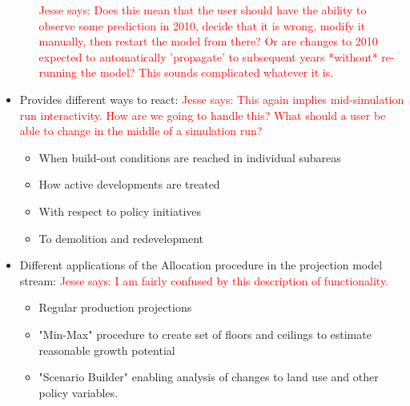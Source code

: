 \documentclass[titlepage]{article}
\begin{document}
\begin{itemize}
\begin{itemize}
				\textcolor{red}{Jesse says: Does this mean that the user should have the ability to observe some prediction in 2010, decide that it is wrong, modify it manually, then restart the model from there?  Or are changes to 2010 expected to automatically 'propagate' to subsequent years *without* re-running the model?  This sounds complicated whatever it is.}
		\end{itemize}
	\item Provides different ways to react:
		\textcolor{red}{Jesse says: This again implies mid-simulation run interactivity.  How are we going to handle this? What should a user be able to change in the middle of a simulation run?}
		\begin{itemize}
			\item When build-out conditions are reached in individual subareas
			\item How active developments are treated
			\item With respect to policy initiatives
			\item To demolition and redevelopment 
		\end{itemize}
	\item Different applications of the Allocation procedure in the projection model stream:
		\textcolor{red}{Jesse says: I am fairly confused by this description of functionality.}
		\begin{itemize}
			\item Regular production projections
			\item "Min-Max" procedure to create set of floors and ceilings to estimate reasonable growth potential
			\item "Scenario Builder" enabling analysis of changes to land use and other policy variables. 
		\end{itemize}
\end{itemize}
\end{document}
